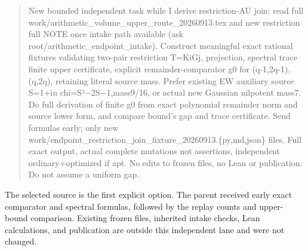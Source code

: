 \begin{quote}
New bounded independent task while I derive restriction-AU join: read full work/arithmetic\_volume\_upper\_route\_20260913.tex and new restriction full NOTE once intake path available (ask root/arithmetic\_endpoint\_intake). Construct meaningful exact rational fixtures validating two-pair restriction T=KiGj, projection, spectral trace finite upper certificate, explicit remainder-comparator g0 for (q-1,2q-1),(q,2q), retaining literal source mass. Prefer existing EW auxiliary source S=1+iu chi=S²−2S−1,mass9/16, or actual new Gaussian nilpotent mass7. Do full derivation of finite g0 from exact polynomial remainder norm and source lower form, and compare bound's gap and trace certificate. Send formulas early; only new work/endpoint\_restriction\_join\_fixture\_20260913.\{py,md,json\} files. Full exact output, actual complete mutations not assertions, independent ordinary+optimized if apt. No edits to frozen files, no Lean or publication. Do not assume a uniform gap.
\end{quote}

The selected source is the first explicit option. The parent received early exact comparator and spectral formulas, followed by the replay counts and upper-bound comparison. Existing frozen files, inherited intake checks, Lean calculations, and publication are outside this independent lane and were not changed.

